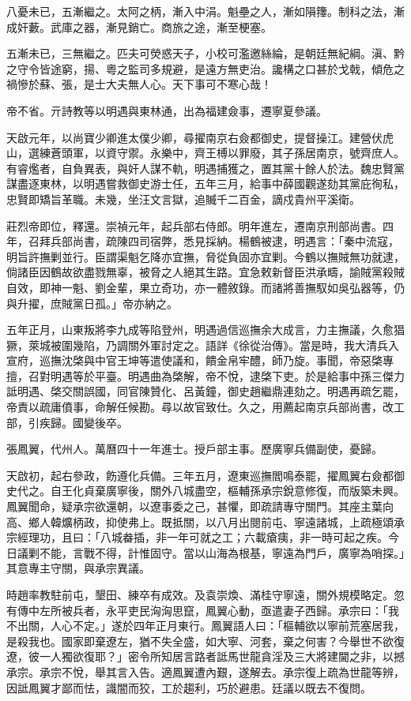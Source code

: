 \begin{pinyinscope}
八憂未已，五漸繼之。太阿之柄，漸入中涓。魁壘之人，漸如隕籜。制科之法，漸成奸藪。武庫之器，漸見銷亡。商旅之途，漸至梗塞。

五漸未已，三無繼之。匹夫可熒惑天子，小校可濫邀絲綸，是朝廷無紀綱。滇、黔之守令皆途窮，揚、粵之監司多規避，是遠方無吏治。讒構之口甚於戈戟，傾危之禍慘於蘇、張，是士大夫無人心。天下事可不寒心哉！

帝不省。亓詩教等以明遇與東林通，出為福建僉事，遷寧夏參議。

天啟元年，以尚寶少卿進太僕少卿，尋擢南京右僉都御史，提督操江。建營伏虎山，選練蒼頭軍，以資守禦。永樂中，齊王榑以罪廢，其子孫居南京，號齊庶人。有睿爁者，自負異表，與奸人謀不軌，明遇捕獲之，置其黨十餘人於法。魏忠賢黨謀盡逐東林，以明遇嘗救御史游士任，五年三月，給事中薛國觀遂劾其黨庇徇私，忠賢即矯旨革職。未幾，坐汪文言獄，追贓千二百金，謫戍貴州平溪衛。

莊烈帝即位，釋還。崇禎元年，起兵部右侍郎。明年進左，遷南京刑部尚書。四年，召拜兵部尚書，疏陳四司宿弊，悉見採納。楊鶴被逮，明遇言：「秦中流寇，明旨許撫剿並行。臣謂渠魁乞降亦宜撫，脅從負固亦宜剿。今鶴以撫賊無功就逮，倘諸臣因鶴故欲盡戮無辜，被脅之人絕其生路。宜急敕新督臣洪承疇，諭賊黨殺賊自效，即神一魁、劉金輩，果立奇功，亦一體敘錄。而諸將善撫馭如吳弘器等，仍與升擢，庶賊黨日孤。」帝亦納之。

五年正月，山東叛將李九成等陷登州，明遇過信巡撫余大成言，力主撫議，久愈猖獗，萊城被圍幾陷，乃調關外軍討定之。語詳《徐從治傳》。當是時，我大清兵入宣府，巡撫沈棨與中官王坤等遣使議和，饋金帛牢醴，師乃旋。事聞，帝惡棨專擅，召對明遇等於平臺。明遇曲為棨解，帝不悅，逮棨下吏。於是給事中孫三傑力詆明遇、棨交關誤國，同官陳贊化、呂黃鐘，御史趙繼鼎連劾之。明遇再疏乞罷，帝責以疏庸僨事，命解任候勘。尋以故官致仕。久之，用薦起南京兵部尚書，改工部，引疾歸。國變後卒。

張鳳翼，代州人。萬曆四十一年進士。授戶部主事。歷廣寧兵備副使，憂歸。

天啟初，起右參政，飭遵化兵備。三年五月，遼東巡撫閻鳴泰罷，擢鳳翼右僉都御史代之。自王化貞棄廣寧後，關外八城盡空，樞輔孫承宗銳意修復，而版築未興。鳳翼聞命，疑承宗欲還朝，以遼事委之己，甚懼，即疏請專守關門。其座主葉向高、鄉人韓爌柄政，抑使弗上。既抵關，以八月出閱前屯、寧遠諸城，上疏極頌承宗經理功，且曰：「八城畚插，非一年可就之工；六載瘡痍，非一時可起之疾。今日議剿不能，言戰不得，計惟固守。當以山海為根基，寧遠為門戶，廣寧為哨探。」其意專主守關，與承宗異議。

時趙率教駐前屯，墾田、練卒有成效。及袁崇煥、滿桂守寧遠，關外規模略定。忽有傳中左所被兵者，永平吏民洶洶思竄，鳳翼心動，亟遣妻子西歸。承宗曰：「我不出關，人心不定。」遂於四年正月東行。鳳翼語人曰：「樞輔欲以寧前荒塞居我，是殺我也。國家即棄遼左，猶不失全盛，如大寧、河套，棄之何害？今舉世不欲復遼，彼一人獨欲復耶？」密令所知居言路者詆馬世龍貪淫及三大將建閫之非，以撼承宗。承宗不悅，舉其言入告。適鳳翼遭內艱，遂解去。承宗復上疏為世龍等辨，因詆鳳翼才鄙而怯，識闇而狡，工於趨利，巧於避患。廷議以既去不復問。


\end{pinyinscope}
